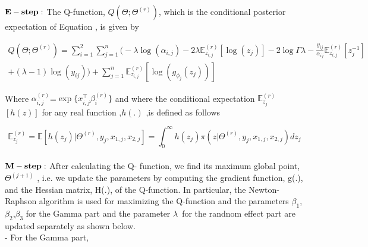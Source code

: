 \documentclass[12pt]{article}%
\theoremstyle{definition}
\theoremstyle{remark}
\begin{document}
$\bold{E-step:}$  The Q-function, $Q(\Theta; \Theta ^{(r)}
)$, which is the conditional posterior expectation of 
Equation , is given by 
\small{
\begin{align}\nonumber
	Q(\Theta; \Theta ^{(r)})=\sum _{i=1}^2\sum _{j=1}^n\bigg( -\lambda\log(\alpha_{i,j})-2\lambda\mathbb{E}_{z_{i,j}}^{(r)} [\log(z_j)]-2\log\Gamma\lambda-\frac{y_{ij}}{\alpha_{ij}}\mathbb{E}_{z_{i,j}}^{(r)}[z_j^{-1}]\\ +(\lambda-1) \log(y_{ij})\bigg)+\sum _{j=1}^n\mathbb{E}_{z_{i,j}}^{(r)}[\log(g_{\phi_j}(z_j))]
\end{align}


Where $\alpha_{i,j} ^{(r)}$=$ \exp\{x_{i,j}^\top
\beta_i^{(r)}
\}$ and where the conditional expectation $\mathbb{E}_{z_{j}}^{(r)}$ $[h(z)]$ for any real function ,$h(.)$ ,is defined as follows

\begin{equation*}
	\mathbb{E}_{z_{j}}^{(r)}=\mathbb{E}[h(z_j)|\Theta^{(r)},y_j,x_{1,j},x_{2,j}]=\int _0^{\infty } h(z_j)\pi(z|\Theta^{(r)},y_j,x_{1,j},x_{2,j})dz_j
\end{equation*}\\
 $\bold{M-step:}$ After calculating the Q- function, we find its maximum global point,$\Theta^{(j+1)}$
, i.e. 
we update the parameters by computing the gradient function, g(.), and the Hessian 
matrix, H(.), of the Q-function. In particular, the Newton-Raphson algorithm is used 
for maximizing the Q-function and the parameters $\beta_1$,$\beta_2$,$\beta_3$
for the Gamma part and 
the parameter $\lambda$\ for the randnom effect part are updated separately as shown below.\\
- For the Gamma part, \\

}
\end{document}
